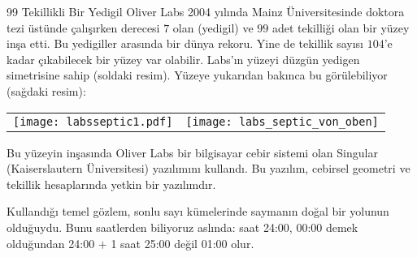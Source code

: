 \begin{surferPage}{99 Tekillikli Bir Yedigil}
    Oliver Labs 2004 yılında Mainz Üniversitesinde doktora tezi üstünde çalışırken  derecesi $7$ olan  (yedigil) ve $99$ adet tekilliği olan bir yüzey inşa etti. Bu yedigiller arasında bir dünya rekoru.
Yine de tekillik sayısı $104$'e kadar çıkabilecek bir yüzey var olabilir.
Labs'ın yüzeyi düzgün yedigen simetrisine sahip (soldaki resim).
Yüzeye yukarıdan bakınca bu görülebiliyor  (sağdaki resim):

    \vspace*{-0.3em}
    \begin{center}
      \begin{tabular}{c@{\qquad}c}
        \texttt{[image: labsseptic1.pdf]}
        &
        \texttt{[image: labs\_septic\_von\_oben]}
      \end{tabular}
    \end{center}
    \vspace*{-0.3em}

Bu yüzeyin inşasında  Oliver Labs bir bilgisayar cebir sistemi olan
    {\sc Singular} (Kaiserslautern Üniversitesi) yazılımını kullandı. Bu yazılım, cebirsel geometri ve tekillik hesaplarında yetkin bir yazılımdır.

Kullandığı temel gözlem, sonlu sayı kümelerinde saymanın doğal bir yolunun olduğuydu. Bunu saatlerden biliyoruz aslında:   saat 24:00, 00:00 demek olduğundan 24:00 $+$ 1 saat  25:00 değil 01:00 olur.
\end{surferPage}
